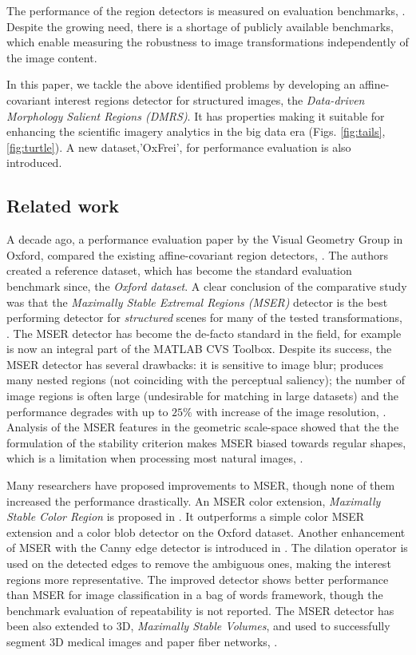 \documentclass{article}
\begin{document}
The performance of the region detectors is measured on evaluation benchmarks, \cite{Mikolajczyk:2005,FischerDB14,CorRos2013}. Despite the growing need, there is a shortage of publicly available benchmarks, which enable measuring the robustness to image transformations independently of the image content.

In this paper, we tackle the above identified problems by developing an affine-covariant interest regions detector for structured images, the {\em Data-driven Morphology Salient Regions (DMRS)}. It has 
properties making it suitable for enhancing the scientific imagery analytics in the big data era (Figs. \ref{fig:tails}, \ref{fig:turtle}). A new dataset,'OxFrei', for performance evaluation is also introduced. 

\subsection{Related work}
\label{ssec:relwork}

A decade ago, a performance evaluation paper by the Visual Geometry Group in Oxford, compared the existing affine-covariant region detectors, \cite{Mikolajczyk:2005}. The authors created a reference dataset, which has become the standard evaluation benchmark since, the {\em Oxford dataset}. A clear conclusion of the comparative study was that the {\em  Maximally Stable Extremal Regions (MSER)} detector is the best performing detector for {\em structured} scenes for many of the tested transformations, \cite{Matas2002BMVC}. The MSER detector has become the de-facto standard in the field, for example is now an integral part of the MATLAB CVS Toolbox. 
Despite its success, the MSER detector has several drawbacks: it is sensitive to image blur; produces many nested regions (not coinciding with the perceptual saliency); the number of image regions is often large (undesirable for matching in large datasets) and the performance degrades with up to $25\%$ with increase of the image resolution, \cite{CorRos2013}. 
Analysis of the MSER features in the geometric scale-space showed that the the formulation of the stability criterion makes MSER biased towards regular shapes, which is a limitation when processing most natural images, \cite{Kimmel11}.

Many researchers have proposed improvements to MSER, though none of them increased the performance drastically. An MSER color extension, {\em Maximally Stable Color Region} is proposed in \cite{Forssen07}.  It outperforms a  simple color MSER extension and a color blob detector on the Oxford dataset. 
Another enhancement of MSER with the Canny edge detector is introduced in \cite{Wang14}. The dilation operator is used on the detected edges to remove the ambiguous ones, making the interest regions more representative. The improved detector shows better performance than MSER for image classification in a bag of words framework, though the benchmark evaluation of repeatability is not reported. 
The MSER detector has been also extended to 3D, {\em Maximally Stable Volumes}, and used to successfully segment 3D medical images and paper fiber networks, \cite{DonoserB06}.
\end{document}

